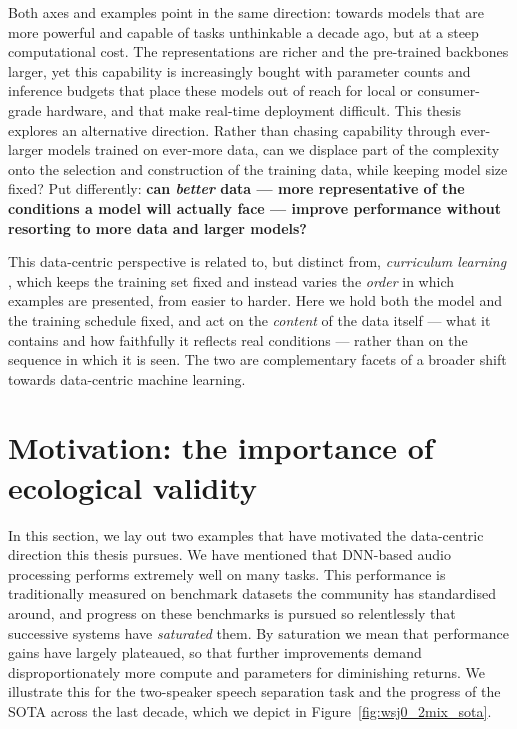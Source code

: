 Both axes and examples point in the same direction: towards models that are more powerful and capable of tasks unthinkable a decade ago, but at a steep computational cost.
The representations are richer and the pre-trained backbones larger, yet this
capability is increasingly bought with parameter counts and inference budgets
that place these models out of reach for local or consumer-grade hardware, and
that make real-time deployment difficult. This thesis explores an alternative
direction. Rather than chasing capability through ever-larger models trained on
ever-more data, can we displace part of the complexity onto the selection and
construction of the training data, while keeping model size fixed? Put differently: \textbf{can \emph{better} data --- more representative of the conditions a
model will actually face --- improve performance without resorting to more data and larger models?} 

\vspace{0.5cm}

This data-centric perspective is related to, but distinct from, \emph{curriculum
learning} \citep{bengio2009curriculum}, which keeps the training set fixed and
instead varies the \emph{order} in which examples are presented, from easier to
harder. Here we hold both the model and the training schedule fixed, and act on
the \emph{content} of the data itself --- what it contains and how faithfully it
reflects real conditions --- rather than on the sequence in which it is seen. The
two are complementary facets of a broader shift towards data-centric machine
learning.


\section{Motivation: the importance of ecological validity}
\label{sec:motivation}
In this section, we lay out two examples that have motivated the data-centric direction this thesis pursues. We have mentioned that \acrshort{DNN}-based audio processing performs extremely well on many tasks. This performance is traditionally measured on benchmark datasets the community
has standardised around, and progress on these benchmarks is pursued so
relentlessly that successive systems have \emph{saturated} them. By saturation we mean that performance gains have largely plateaued, so that further improvements demand disproportionately more compute and parameters for diminishing returns. We illustrate this for the two-speaker speech separation task and the progress of the \acrfull{SOTA} across the last decade, which we depict in Figure~\ref{fig:wsj0_2mix_sota}.

